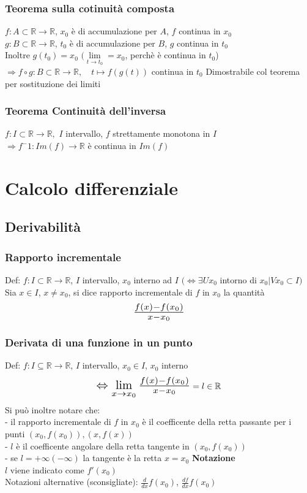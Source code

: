 \documentclass{article}
\begin{document}
\subsubsection{Teorema sulla cotinuità composta}
$f: A \subset \mathbb{R} \to \mathbb{R}$, $x_0$ è di accumulazione per $A$, $f$ continua in $x_0$\\
$g:  B \subset \mathbb{R} \to \mathbb{R}$, $t_0$ è di accumulazione per $B$, $g$ continua in $t_0$\\
Inoltre $g(t_0) = x_0$ $(\lim\limits_{t \to t_0} = x_0$, perchè è continua in $t_0$)\\
$\Rightarrow f \circ g: B \subset \mathbb{R} \to \mathbb{R}, \quad t \longmapsto f(g(t))$ continua in $t_0$
\bigbreak
\noindent Dimostrabile col teorema per sostituzione dei limiti

\subsubsection{Teorema Continuità dell'inversa}
$f: I \subset \mathbb{R} \to \mathbb{R},$ $I$ intervallo, $f$ strettamente monotona in $I$\\
$\Rightarrow f^-1: Im(f) \to \mathbb{R}$ è continua in $Im(f)$ 


\section{Calcolo differenziale}
\subsection{Derivabilità}
\subsubsection{Rapporto incrementale}
Def: $f: I \subset \mathbb{R} \to \mathbb{R}$, $I$ intervallo, $x_0$ interno ad $I$ $(\Leftrightarrow \exists Ux_0$ intorno di $x_0| Vx_0 \subset I)$\\
Sia $x \in I$, $x \neq x_0$, si dice rapporto incrementale di $f$ in $x_0$ la quantità 
\[\scalebox{1.4}{$\frac{f(x)-f(x_0)}{x-x_0}$}\]

\subsubsection{Derivata di una funzione in un punto}
Def: $f: I \subseteq \mathbb{R} \to \mathbb{R}$, $I$ intervallo, $x_0 \in I$, $x_0$ interno
\[\scalebox{1.4}{$\Leftrightarrow \lim\limits_{x \to x_0}\frac{f(x)-f(x_0)}{x-x_0}$} = l \in \mathbb{R}\]
Si può inoltre notare che:\\ 
- il rapporto incrementale di $f$ in $x_0$ è il coefficente della retta passante per i punti $(x_0, f(x_0)),(x, f(x))$\\
- $l$ è il coefficente angolare della retta tangente in $(x_0, f(x_0))$\\ 
- se $l=+\infty(-\infty)$ la tangente è la retta $x = x_0$
\bigbreak
\noindent\textbf{Notazione}\\
$l$ viene indicato come $f'(x_0)$\\
Notazioni alternative (sconsigliate): $\frac{d}{dx}f(x_0)$, $\frac{df}{dx}f(x_0)$
\end{document}
